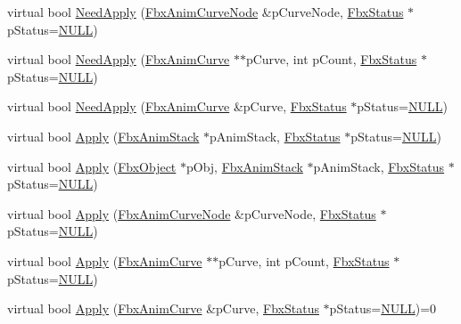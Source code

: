 \begin{DoxyCompactItemize}
\item 
virtual bool \hyperlink{class_fbx_anim_curve_filter_a2a88d855d34bb1f2f22ca8386020b33a}{Need\+Apply} (\hyperlink{class_fbx_anim_curve_node}{Fbx\+Anim\+Curve\+Node} \&p\+Curve\+Node, \hyperlink{class_fbx_status}{Fbx\+Status} $\ast$p\+Status=\hyperlink{fbxarch_8h_a070d2ce7b6bb7e5c05602aa8c308d0c4}{N\+U\+LL})
\item 
virtual bool \hyperlink{class_fbx_anim_curve_filter_a6b210eca45b745cf070c46bfaaf3e5b2}{Need\+Apply} (\hyperlink{class_fbx_anim_curve}{Fbx\+Anim\+Curve} $\ast$$\ast$p\+Curve, int p\+Count, \hyperlink{class_fbx_status}{Fbx\+Status} $\ast$p\+Status=\hyperlink{fbxarch_8h_a070d2ce7b6bb7e5c05602aa8c308d0c4}{N\+U\+LL})
\item 
virtual bool \hyperlink{class_fbx_anim_curve_filter_af768a9c47e4f5a5fff47a8ec781e6b4c}{Need\+Apply} (\hyperlink{class_fbx_anim_curve}{Fbx\+Anim\+Curve} \&p\+Curve, \hyperlink{class_fbx_status}{Fbx\+Status} $\ast$p\+Status=\hyperlink{fbxarch_8h_a070d2ce7b6bb7e5c05602aa8c308d0c4}{N\+U\+LL})
\item 
virtual bool \hyperlink{class_fbx_anim_curve_filter_aef3900e6180e05661c27ee484ae939c3}{Apply} (\hyperlink{class_fbx_anim_stack}{Fbx\+Anim\+Stack} $\ast$p\+Anim\+Stack, \hyperlink{class_fbx_status}{Fbx\+Status} $\ast$p\+Status=\hyperlink{fbxarch_8h_a070d2ce7b6bb7e5c05602aa8c308d0c4}{N\+U\+LL})
\item 
virtual bool \hyperlink{class_fbx_anim_curve_filter_a009498a65af4995bf5e5908f17837531}{Apply} (\hyperlink{class_fbx_object}{Fbx\+Object} $\ast$p\+Obj, \hyperlink{class_fbx_anim_stack}{Fbx\+Anim\+Stack} $\ast$p\+Anim\+Stack, \hyperlink{class_fbx_status}{Fbx\+Status} $\ast$p\+Status=\hyperlink{fbxarch_8h_a070d2ce7b6bb7e5c05602aa8c308d0c4}{N\+U\+LL})
\item 
virtual bool \hyperlink{class_fbx_anim_curve_filter_ad042b45c0675278fa49e61739b0825c2}{Apply} (\hyperlink{class_fbx_anim_curve_node}{Fbx\+Anim\+Curve\+Node} \&p\+Curve\+Node, \hyperlink{class_fbx_status}{Fbx\+Status} $\ast$p\+Status=\hyperlink{fbxarch_8h_a070d2ce7b6bb7e5c05602aa8c308d0c4}{N\+U\+LL})
\item 
virtual bool \hyperlink{class_fbx_anim_curve_filter_aca6a41fbc4d9019b20df7adccfa6ed3c}{Apply} (\hyperlink{class_fbx_anim_curve}{Fbx\+Anim\+Curve} $\ast$$\ast$p\+Curve, int p\+Count, \hyperlink{class_fbx_status}{Fbx\+Status} $\ast$p\+Status=\hyperlink{fbxarch_8h_a070d2ce7b6bb7e5c05602aa8c308d0c4}{N\+U\+LL})
\item 
virtual bool \hyperlink{class_fbx_anim_curve_filter_a6a69996c47c0e6f63a0f8b0d5fa806a0}{Apply} (\hyperlink{class_fbx_anim_curve}{Fbx\+Anim\+Curve} \&p\+Curve, \hyperlink{class_fbx_status}{Fbx\+Status} $\ast$p\+Status=\hyperlink{fbxarch_8h_a070d2ce7b6bb7e5c05602aa8c308d0c4}{N\+U\+LL})=0

\end{DoxyCompactItemize}
